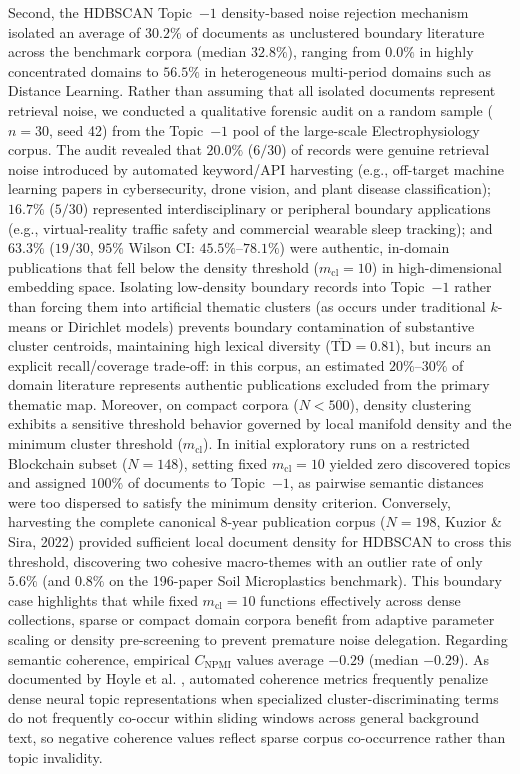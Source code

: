 \documentclass[preprint,12pt]{elsarticle}
\begin{document}
Second, the HDBSCAN Topic~$-1$ density-based noise rejection mechanism isolated an average of $30.2\%$ of documents as unclustered boundary literature across the benchmark corpora (median $32.8\%$), ranging from $0.0\%$ in highly concentrated domains to $56.5\%$ in heterogeneous multi-period domains such as Distance Learning. Rather than assuming that all isolated documents represent retrieval noise, we conducted a qualitative forensic audit on a random sample ($n = 30$, seed 42) from the Topic~$-1$ pool of the large-scale Electrophysiology corpus. The audit revealed that $20.0\%$ ($6/30$) of records were genuine retrieval noise introduced by automated keyword/API harvesting (e.g., off-target machine learning papers in cybersecurity, drone vision, and plant disease classification); $16.7\%$ ($5/30$) represented interdisciplinary or peripheral boundary applications (e.g., virtual-reality traffic safety and commercial wearable sleep tracking); and $63.3\%$ ($19/30$, $95\%$ Wilson CI: $45.5\%\text{--}78.1\%$) were authentic, in-domain publications that fell below the density threshold ($m_{\text{cl}} = 10$) in high-dimensional embedding space. Isolating low-density boundary records into Topic~$-1$ rather than forcing them into artificial thematic clusters (as occurs under traditional $k$-means or Dirichlet models) prevents boundary contamination of substantive cluster centroids, maintaining high lexical diversity ($\overline{\text{TD}} = 0.81$), but incurs an explicit recall/coverage trade-off: in this corpus, an estimated $20\%\text{--}30\%$ of domain literature represents authentic publications excluded from the primary thematic map. Moreover, on compact corpora ($N < 500$), density clustering exhibits a sensitive threshold behavior governed by local manifold density and the minimum cluster threshold ($m_{\text{cl}}$). In initial exploratory runs on a restricted Blockchain subset ($N = 148$), setting fixed $m_{\text{cl}} = 10$ yielded zero discovered topics and assigned $100\%$ of documents to Topic~$-1$, as pairwise semantic distances were too dispersed to satisfy the minimum density criterion. Conversely, harvesting the complete canonical 8-year publication corpus ($N = 198$, Kuzior \& Sira, 2022) provided sufficient local document density for HDBSCAN to cross this threshold, discovering two cohesive macro-themes with an outlier rate of only $5.6\%$ (and $0.8\%$ on the 196-paper Soil Microplastics benchmark). This boundary case highlights that while fixed $m_{\text{cl}} = 10$ functions effectively across dense collections, sparse or compact domain corpora benefit from adaptive parameter scaling or density pre-screening to prevent premature noise delegation. Regarding semantic coherence, empirical $C_{\text{NPMI}}$ values average $-0.29$ (median $-0.29$). As documented by Hoyle et al. \cite{hoyle2021automated}, automated coherence metrics frequently penalize dense neural topic representations when specialized cluster-discriminating terms do not frequently co-occur within sliding windows across general background text, so negative coherence values reflect sparse corpus co-occurrence rather than topic invalidity.
\end{document}
